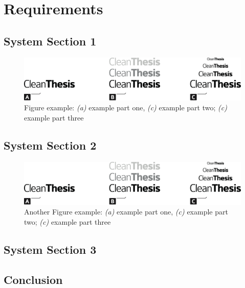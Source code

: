 %
\chapter{Requirements}
\label{sec:requirements}


\Blindtext[2][1]

\section{System Section 1}
\label{sec:requirements:sec1}

\Blindtext[1][2]

\begin{figure}[htb]
	\includegraphics[width=\textwidth]{gfx/Clean-Thesis-Figure}
	\caption{Figure example: \textit{(a)} example part one, \textit{(c)} example part two; \textit{(c)} example part three}
	\label{fig:requirements:example1}
\end{figure}

\Blindtext[1][2]

\section{System Section 2}
\label{sec:requirements:sec2}

\Blindtext[1][2]

\begin{figure}[htb]
	\includegraphics[width=\textwidth]{gfx/Clean-Thesis-Figure}
	\caption{Another Figure example: \textit{(a)} example part one, \textit{(c)} example part two; \textit{(c)} example part three}
	\label{fig:requirements:example2}
\end{figure}

\Blindtext[2][2]

\section{System Section 3}
\label{sec:requirements:sec3}

\Blindtext[4][2]

\section{Conclusion}
\label{sec:requirements:conclusion}

\Blindtext[2][1]
